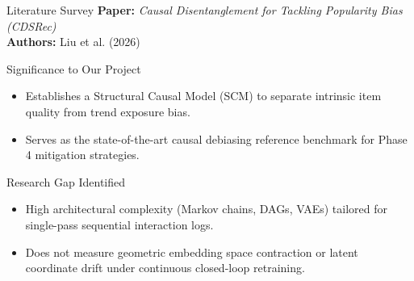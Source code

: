\documentclass[11pt,aspectratio=43,xcolor=table]{beamer}
\begin{document}
\begin{frame}{Literature Survey}
\small
\textbf{Paper:} \emph{Causal Disentanglement for Tackling Popularity Bias (CDSRec)} \\
\textbf{Authors:} Liu et al. (2026)

\vspace{0.15cm}
\begin{block}{Significance to Our Project}
\begin{itemize}
  \item Establishes a Structural Causal Model (SCM) to separate intrinsic item quality from trend exposure bias.
  \item Serves as the state-of-the-art causal debiasing reference benchmark for Phase 4 mitigation strategies.
\end{itemize}
\end{block}

\vspace{0.05cm}
\begin{block}{Research Gap Identified}
\begin{itemize}
  \item High architectural complexity (Markov chains, DAGs, VAEs) tailored for single-pass sequential interaction logs.
  \item Does not measure geometric embedding space contraction or latent coordinate drift under continuous closed-loop retraining.
\end{itemize}
\end{block}
\end{frame}
\end{document}
